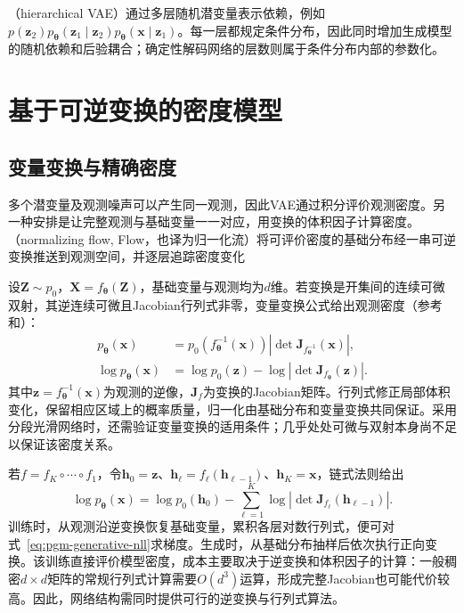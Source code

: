 （hierarchical VAE）通过多层随机潜变量表示依赖，例如$p(\bm{z}_2)p_{\bm{\theta}}(\bm{z}_1\mid\bm{z}_2)p_{\bm{\theta}}(\bm{x}\mid\bm{z}_1)$。每一层都规定条件分布，因此同时增加生成模型的随机依赖和后验耦合；确定性解码网络的层数则属于条件分布内部的参数化。

\section{基于可逆变换的密度模型}
\label{sec:pgm-generative-flows}

\subsection{变量变换与精确密度}
\label{sec:pgm-generative-change-of-variables}

多个潜变量及观测噪声可以产生同一观测，因此VAE通过积分评价观测密度。另一种安排是让完整观测与基础变量一一对应，用变换的体积因子计算密度。（normalizing flow, Flow，也译为归一化流）将可评价密度的基础分布经一串可逆变换推送到观测空间，并逐层追踪密度变化

设$\bm Z\sim p_0$，$\bm X=f_{\bm\theta}(\bm Z)$，基础变量与观测均为$d$维。若变换是开集间的连续可微双射，其逆连续可微且Jacobian行列式非零，变量变换公式给出观测密度（参考和）：
\begin{equation}
  \label{eq:pgm-generative-flow-density}
  \begin{aligned}
    p_{\bm{\theta}}(\bm{x})
      &=p_0(f_{\bm{\theta}}^{-1}(\bm{x}))
         \left|\det\bm{J}_{f_{\bm{\theta}}^{-1}}(\bm{x})\right|,\\
    \log p_{\bm{\theta}}(\bm{x})
      &=\log p_0(\bm{z})-
         \log\left|\det\bm{J}_{f_{\bm{\theta}}}(\bm{z})\right|.
  \end{aligned}
\end{equation}
其中$\bm z=f_{\bm\theta}^{-1}(\bm x)$为观测的逆像，$\bm J_f$为变换的Jacobian矩阵。行列式修正局部体积变化，保留相应区域上的概率质量，归一化由基础分布和变量变换共同保证。采用分段光滑网络时，还需验证变量变换的适用条件；几乎处处可微与双射本身尚不足以保证该密度关系。

若$f=f_K\circ\cdots\circ f_1$，令$\bm{h}_0=\bm{z}$、$\bm{h}_{\ell}=f_{\ell}(\bm{h}_{\ell-1})$、$\bm{h}_K=\bm{x}$，链式法则给出
\begin{equation}
  \label{eq:pgm-generative-flow-composition}
  \log p_{\bm{\theta}}(\bm{x})
  =\log p_0(\bm{h}_0)
   -\sum_{\ell=1}^{K}
      \log|\det\bm{J}_{f_{\ell}}(\bm{h}_{\ell-1})|.
\end{equation}
训练时，从观测沿逆变换恢复基础变量，累积各层对数行列式，便可对式~\eqref{eq:pgm-generative-nll}求梯度。生成时，从基础分布抽样后依次执行正向变换。该训练直接评价模型密度，成本主要取决于逆变换和体积因子的计算：一般稠密$d\times d$矩阵的常规行列式计算需要$O(d^3)$运算，形成完整Jacobian也可能代价较高。因此，网络结构需同时提供可行的逆变换与行列式算法。

